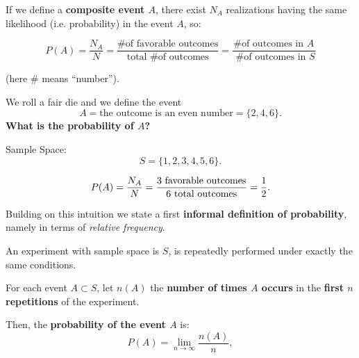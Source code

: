\documentclass[notes=show]{beamer}\usepackage[]{graphicx}\usepackage[]{color}
\newcommand{\bea}{\begin{eqnarray}}
\newcommand{\eea}{\end{eqnarray}}
\begin{document}
\begin{frame}{\secname}

If we define a \textbf{composite event $A$}, there exist $N_A$ realizations having the same likelihood (i.e. probability) in the event $A$, so:

$$\boxed{P(A)=\frac{N_A}{N}=\frac{\mbox{\# of favorable outcomes}}{\mbox{total \# of outcomes}}=\frac{\mbox{\# of outcomes in $A$}}{\mbox{ \# of outcomes in $S$}}}$$

(here $\# $ means ``number'').

\end{frame}


\begin{frame}{\secname}

\begin{example}
We roll a fair die and we define the event $$A=\text{the outcome is an even number}=\{2,4,6\}.$$
\textbf{What is the probability of $A$?}
\vspace{0.5cm}

\pause
Sample Space:
$$S=\{1,2,3,4,5,6\}.$$

\pause
$$P(A)=\frac{N_A}{N} = \frac{\mbox{3 \text{favorable outcomes}}}{\mbox{6 total outcomes}} = \frac{1}{2}. %
$$


\end{example}


\end{frame}


\begin{frame}{\secname}

Building on this intuition we state a first \textbf{informal definition of probability}, namely in terms of \textit{relative frequency}.

\pause

\begin{definition}[Informal]
An experiment with sample space is $S$, is repeatedly performed under exactly the same conditions.

For each event $A\subset S$, let $n(A)$ the \textbf{number of times $A$ occurs} in the \textbf{first $n$ repetitions} of the experiment.

\pause

Then, the \textbf{probability of the event $A$} is:
$$
P(A)=\lim_{n \to \infty} \frac{n(A)}{n},
$$
\end{definition}
\end{frame}
\end{document}
